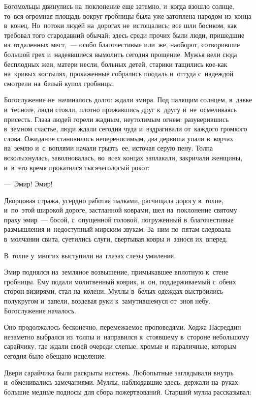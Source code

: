 \documentclass[12pt,a4paper]{book}
\begin{document}
Богомольцы двинулись на~поклонение еще затемно, и~когда взошло солнце, то~вся огромная площадь вокруг гробницы была уже затоплена народом из~конца в~конец. Но~потоки людей на~дорогах не~истощались; все шли босиком, как требовал того стародавний обычай; здесь среди прочих были люди, пришедшие из~отдаленных мест,~— особо благочестивые или~же, наоборот, сотворившие большой грех и~надеявшиеся вымолить сегодня прощение. Мужья вели сюда бесплодных жен, матери несли, больных детей, старики тащились кое-как на~кривых костылях, прокаженные собрались поодаль и~оттуда с~надеждой смотрели на~белый купол гробницы.

Богослужение не~начиналось долго: ждали эмира. Под палящим солнцем, в~давке и~тесноте, люди стояли, плотно прижавшись друг к~другу и~не~осмеливаясь присесть. Глаза людей горели жадным, неутолимым огнем: разуверившись в~земном счастье, люди ждали сегодня чуда и~вздрагивали от~каждого громкого слова. Ожидание становилось непереносимым, два дервиша упали в~корчах на~землю и~с~воплями начали грызть~ее, источая серую пену. Толпа всколыхнулась, заволновалась, во~всех концах заплакали, закричали женщины, и~в~это время прокатился тысячеголосый рокот:

—~Эмир! Эмир!

Дворцовая стража, усердно работая палками, расчищала дорогу в~толпе, и~по~этой широкой дороге, застланной коврами, шел на~поклонение святому праху эмир~— босой, с~опущенной головой, погруженный в~благочестивые размышления и~недоступный мирским звукам. За~ним по~пятам следовала в~молчании свита, суетились слуги, свертывая ковры и~занося их~вперед.

В~толпе у~многих выступили на~глазах слезы умиления.

Эмир поднялся на~земляное возвышение, примыкавшее вплотную к~стене гробницы. Ему подали молитвенный коврик, и~он, поддерживаемый с~обеих сторон визирями, стал на~колени. Муллы в~белых одеждах выстроились полукругом и~запели, воздевая руки к~замутившемуся от~зноя небу. Богослужение началось.

Оно продолжалось бесконечно, перемежаемое проповедями. Ходжа Насреддин незаметно выбрался из~толпы и~направился к~стоявшему в~стороне небольшому сарайчику, где ждали своей очереди слепые, хромые и~параличные, которым сегодня было обещано исцеление.

Двери сарайчика были раскрыты настежь. Любопытные заглядывали внутрь и~обменивались замечаниями. Муллы, наблюдавшие здесь, держали на~руках большие медные подносы для сбора пожертвований. Старший мулла рассказывал:
\end{document}
